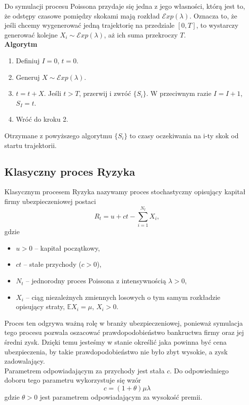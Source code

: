 \documentclass[12pt]{mwart}
\begin{document}
	\noindent Do symulacji procesu Poissona przydaje się jedna z jego własności, którą jest to, że odstępy czasowe pomiędzy skokami mają rozkład $\mathcal{E}xp(\lambda)$.
	Oznacza to, że jeśli chcemy wygenerować jedną trajektorię na przedziale $[0, T]$, to wystarczy generować kolejne $X_i \sim \mathcal{E}xp(\lambda)$, aż ich suma przekroczy $T$.\\
	
	\noindent \textbf{Algorytm}
	\begin{enumerate}[leftmargin=10mm]
		\item Definiuj $I = 0$, $t=0$.
		\item Generuj $X \sim \mathcal{E}xp(\lambda)$.
		\item $t = t + X$. Jeśli $t > T$, przerwij i zwróć $\{S_i\}$. W przeciwnym razie $I = I + 1$, $S_I = t$.
		\item Wróć do kroku 2.
	\end{enumerate}
	Otrzymane z powyższego algorytmu $\{S_i\}$ to czasy oczekiwania na i-ty skok od startu trajektorii.
	
	
	
	\subsection{Klasyczny proces Ryzyka}
	
	\noindent Klasycznym procesem Ryzyka nazywamy proces stochastyczny opisujący kapitał firmy ubezpieczeniowej postaci
	$$ R_t = u + ct - \sum_{i=1}^{N_t} X_i, $$
	gdzie
	\begin{itemize}[leftmargin=10mm, label={\small$\bullet$}]
		\item $u > 0$ -- kapitał początkowy,
		\item $ct$ -- stałe przychody ($c > 0$),
		\item $N_t$ -- jednorodny proces Poissona z intensywnością $\lambda > 0$,
		\item $X_i$ -- ciąg niezależnych zmiennych losowych o tym samym rozkładzie opisujący straty, $\mathbb{E}X_i = \mu$, $X_i > 0$.
	\end{itemize}
	Proces ten odgrywa ważną rolę w branży ubezpieczeniowej, ponieważ symulacja tego procesu pozwala oszacować prawdopodobieństwo bankructwa firmy oraz jej średni zysk. Dzięki temu jesteśmy w stanie określić jaka powinna być cena ubezpieczenia, by takie prawdopodobieństwo nie było zbyt wysokie, a zysk zadowalający.\vspace{1.5mm}\\
	Parametrem odpowiadającym za przychody jest stała $c$. Do odpowiedniego doboru tego parametru wykorzystuje się wzór
	\begin{equation}\label{c}
		c = (1 + \theta)\mu\lambda
	\end{equation}
	gdzie $\theta > 0$ jest parametrem odpowiadającym za wysokość premii.\\
	
\end{document}

